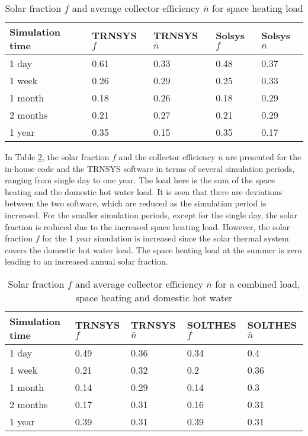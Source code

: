 \documentclass{article}
\begin{document}
\begin{table}
\caption{\label{tab:Solar_fraction_heating_load} Solar fraction $f$ and average collector efficiency $\bar{n}$ for space heating load}
\centering
\begin{tabular}{|l|l|l|l|l|}
\hline
Simulation time & TRNSYS $f$ & TRNSYS $\bar{n}$  & Solsys $f$	& Solsys $\bar{n}$ \\\hline
1 day	& 0.61 & 0.33 & 0.48 & 0.37 \\\hline
1 week & 0.26 &	0.29 & 0.25 & 0.33 \\\hline
1 month & 0.18 &	0.26 &	0.18 & 0.29 \\\hline
2 months & 0.21 & 0.27 &	0.21 & 0.29 \\\hline
1 year & 0.35 &	0.15 &	0.35 &	0.17 \\\hline
\end{tabular}
\end{table}

In Table \ref{tab:Solar_fraction_combined_load}, the solar fraction $f$ and the collector efficiency $\bar{n}$ are presented for the in-house code and the TRNSYS software in terms of several simulation periods, ranging from single day to one year. The load here is the sum of the space heating and the domestic hot water load. It is seen that there are deviations between the two software, which are reduced as the simulation period is increased. For the smaller simulation periods, except for the single day, the solar fraction is reduced due to the increased space heating load. However, the solar fraction $f$ for the 1 year simulation is increased since the solar thermal system covers the domestic hot water load. The space heating load at the summer is zero leading to an increased annual solar fraction.

\begin{table}
\caption{\label{tab:Solar_fraction_combined_load} Solar fraction $f$ and average collector efficiency $\bar{n}$ for a combined load, space heating and domestic hot water}
\centering
\begin{tabular}{|l|l|l|l|l|}
\hline
Simulation time & TRNSYS $f$ & TRNSYS $\bar{n}$  & SOLTHES $f$	& SOLTHES $\bar{n}$ \\\hline
1 day	& 0.49 & 0.36 & 0.34 & 0.4 \\\hline
1 week & 0.21 &	0.32 & 0.2 & 0.36 \\\hline
1 month & 0.14 &	0.29 &	0.14 & 0.3 \\\hline
2 months & 0.17 & 0.31 &	0.16 & 0.31 \\\hline
1 year & 0.39 &	0.31 &	0.39 &	0.31 \\\hline
\end{tabular}
\end{table}
\end{document}
